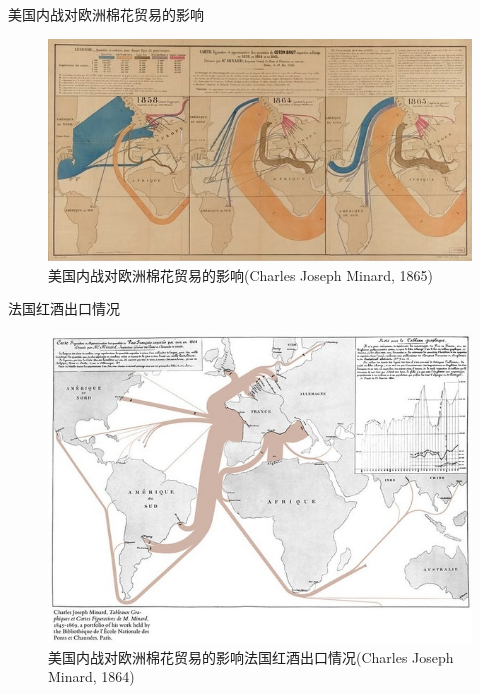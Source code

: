 \documentclass{beamerthemeMono}
\begin{document}
\begin{frame}{\subsecname}{美国内战对欧洲棉花贸易的影响}

 \begin{figure}
   \centering \includegraphics[width=\columnwidth]{美国内战对欧洲棉花贸易的影响.jpg}
   \caption{美国内战对欧洲棉花贸易的影响(Charles Joseph Minard, 1865)}
 \end{figure}

\end{frame}

\begin{frame}{\subsecname}{法国红酒出口情况}

 \begin{figure}
   \centering \includegraphics[width=0.8\columnwidth]{法国红酒出口情况.jpg}
   \caption{美国内战对欧洲棉花贸易的影响法国红酒出口情况(Charles
     Joseph Minard, 1864)}
 \end{figure}

\end{frame}
\end{document}
